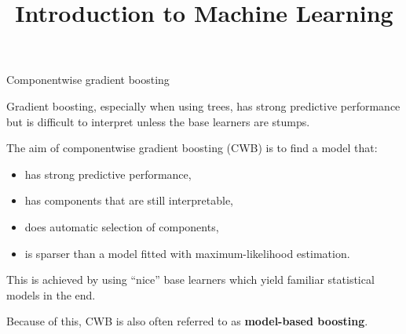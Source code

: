 \documentclass[11pt,compress,t,notes=noshow, xcolor=table]{beamer}
\title{Introduction to Machine Learning}
\date{}
\begin{document}


\begin{vbframe}{Componentwise gradient boosting}

Gradient boosting, especially when using trees, has strong predictive
performance but is difficult to interpret unless the base learners are stumps.

\lz

The aim of componentwise gradient boosting (CWB) is to find a model that:

\begin{itemize}
  \item
    has strong predictive performance,

  \item
    has components that are still interpretable,

  \item
    does automatic selection of components,

  \item
    is sparser than a model fitted with maximum-likelihood estimation.
\end{itemize}

\lz

This is achieved by using \enquote{nice} base learners which yield familiar
statistical models
in the end.

\lz

Because of this, CWB is also often referred to as \textbf{model-based boosting}.

\end{vbframe}

\end{document}
